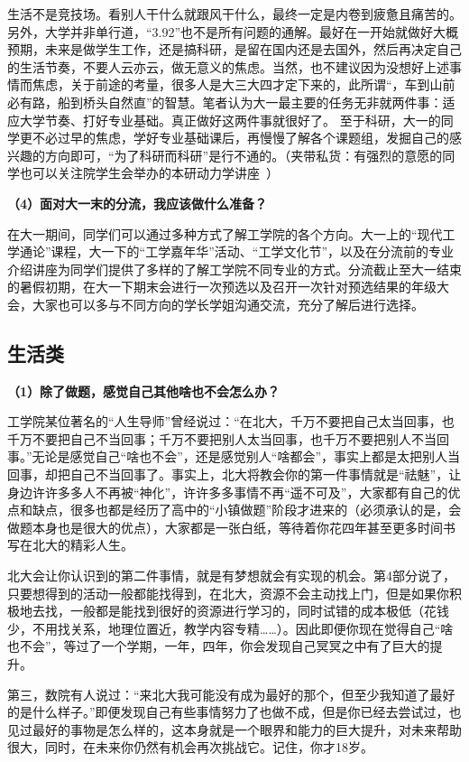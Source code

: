 \documentclass[11pt,oneside]{book}
\begin{document}
生活不是竞技场。看别人干什么就跟风干什么，最终一定是内卷到疲惫且痛苦的。另外，大学并非单行道，“3.92”也不是所有问题的通解。最好在一开始就做好大概预期，未来是做学生工作，还是搞科研，是留在国内还是去国外，然后再决定自己的生活节奏，不要人云亦云，做无意义的焦虑。当然，也不建议因为没想好上述事情而焦虑，关于前途的考量，很多人是大三大四才定下来的，此所谓“，车到山前必有路，船到桥头自然直”的智慧。笔者认为大一最主要的任务无非就两件事：适应大学节奏、打好专业基础。真正做好这两件事就很好了。
至于科研，大一的同学更不必过早的焦虑，学好专业基础课后，再慢慢了解各个课题组，发掘自己的感兴趣的方向即可，“为了科研而科研”是行不通的。（夹带私货：有强烈的意愿的同学也可以关注院学生会举办的本研动力学讲座~）

\textbf{（4）面对大一末的分流，我应该做什么准备？}

在大一期间，同学们可以通过多种方式了解工学院的各个方向。大一上的“现代工学通论”课程，大一下的“工学嘉年华”活动、“工学文化节”，以及在分流前的专业介绍讲座为同学们提供了多样的了解工学院不同专业的方式。分流截止至大一结束的暑假初期，在大一下期末会进行一次预选以及召开一次针对预选结果的年级大会，大家也可以多与不同方向的学长学姐沟通交流，充分了解后进行选择。

\subsection{生活类}
\textbf{（1）除了做题，感觉自己其他啥也不会怎么办？}

工学院某位著名的“人生导师”曾经说过：“在北大，千万不要把自己太当回事，也千万不要把自己不当回事；千万不要把别人太当回事，也千万不要把别人不当回事。”无论是感觉自己“啥也不会”，还是感觉别人“啥都会”，事实上都是太把别人当回事，却把自己不当回事了。事实上，北大将教会你的第一件事情就是“祛魅”，让身边许许多多人不再被“神化”，许许多多事情不再“遥不可及”，大家都有自己的优点和缺点，很多也都是经历了高中的“小镇做题”阶段才进来的（必须承认的是，会做题本身也是很大的优点），大家都是一张白纸，等待着你花四年甚至更多时间书写在北大的精彩人生。

北大会让你认识到的第二件事情，就是有梦想就会有实现的机会。第4部分说了，只要想得到的活动一般都能找得到，在北大，资源不会主动找上门，但是如果你积极地去找，一般都是能找到很好的资源进行学习的，同时试错的成本极低（花钱少，不用找关系，地理位置近，教学内容专精……）。因此即便你现在觉得自己“啥也不会”，等过了一个学期，一年，四年，你会发现自己冥冥之中有了巨大的提升。

第三，数院有人说过：“来北大我可能没有成为最好的那个，但至少我知道了最好的是什么样子。”即便发现自己有些事情努力了也做不成，但是你已经去尝试过，也见过最好的事物是怎么样的，这本身就是一个眼界和能力的巨大提升，对未来帮助很大，同时，在未来你仍然有机会再次挑战它。记住，你才18岁。
\end{document}
